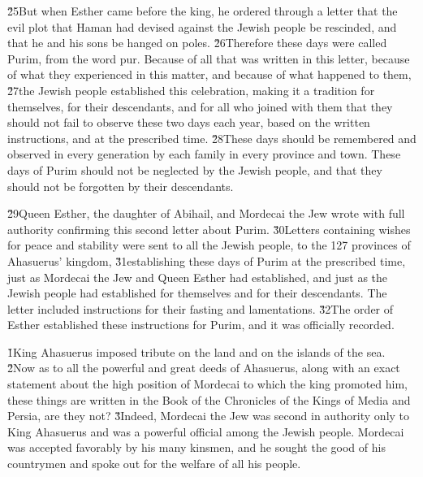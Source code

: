 \v{25}But when Esther came before the king, he ordered through a letter that the evil plot that Haman had devised against the Jewish people be rescinded, and that he and his sons be hanged on poles. \v{26}Therefore these days were called Purim, from the word pur. Because of all that was written in this letter, because of what they experienced in this matter, and because of what happened to them, \v{27}the Jewish people established this celebration, making it a tradition for themselves, for their descendants, and for all who joined with them that they should not fail to observe these two days each year, based on the written instructions, and at the prescribed time. \v{28}These days should be remembered and observed in every generation by each family in every province and town. These days of Purim should not be neglected by the Jewish people, and that they should not be forgotten by their descendants.

\v{29}Queen Esther, the daughter of Abihail, and Mordecai the Jew wrote with full authority confirming this second letter about Purim. \v{30}Letters containing wishes for peace and stability were sent to all the Jewish people, to the 127 provinces of Ahasuerus' kingdom, \v{31}establishing these days of Purim at the prescribed time, just as Mordecai the Jew and Queen Esther had established, and just as the Jewish people had established for themselves and for their descendants. The letter included instructions for their fasting and lamentations. \v{32}The order of Esther established these instructions for Purim, and it was officially recorded.

\v{1}King Ahasuerus imposed tribute on the land and on the islands of the sea. \v{2}Now as to all the powerful and great deeds of Ahasuerus, along with an exact statement about the high position of Mordecai to which the king promoted him, these things are written in the Book of the Chronicles of the Kings of Media and Persia, are they not? \v{3}Indeed, Mordecai the Jew was second in authority only to King Ahasuerus and was a powerful official among the Jewish people. Mordecai was accepted favorably by his many kinsmen, and he sought the good of his countrymen and spoke out for the welfare of all his people.
